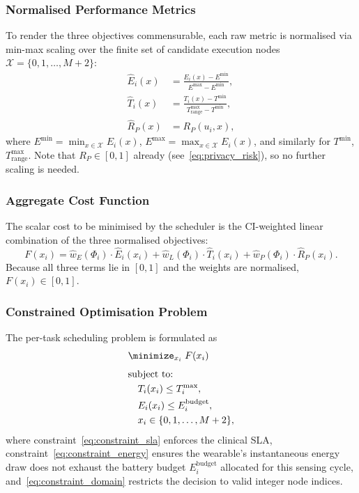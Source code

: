 \documentclass[journal,twoside,letterpaper]{IEEEtran}
\newcommand{\set}[1]{\mathcal{#1}}
\begin{document}
\subsubsection{Normalised Performance Metrics}

To render the three objectives commensurable, each raw metric is normalised
via min-max scaling over the finite set of candidate execution nodes
$\set{X} = \{0, 1, \ldots, M+2\}$:
\begin{align}
  \hat{E}_i(x) &= \frac{E_i(x) - E^{\min}}{E^{\max} - E^{\min}},
  \label{eq:norm_energy}\\[4pt]
  \hat{T}_i(x) &= \frac{T_i(x) - T^{\min}}{T^{\max}_{\mathrm{range}} - T^{\min}},
  \label{eq:norm_latency}\\[4pt]
  \hat{R}_P(x) &= R_P(u_i, x),
  \label{eq:norm_privacy}
\end{align}
where $E^{\min} = \min_{x \in \set{X}} E_i(x)$,
$E^{\max} = \max_{x \in \set{X}} E_i(x)$, and similarly for
$T^{\min}$, $T^{\max}_{\mathrm{range}}$.  Note that $R_P \in [0,1]$
already (see~\eqref{eq:privacy_risk}), so no further scaling is needed.

\subsubsection{Aggregate Cost Function}

The scalar cost to be minimised by the scheduler is the CI-weighted linear
combination of the three normalised objectives:
\begin{equation}
  F(x_i) =
    \hat{w}_E(\Phi_i) \cdot \hat{E}_i(x_i)
    + \hat{w}_L(\Phi_i) \cdot \hat{T}_i(x_i)
    + \hat{w}_P(\Phi_i) \cdot \hat{R}_P(x_i).
  \label{eq:cost_function}
\end{equation}
Because all three terms lie in $[0,1]$ and the weights are normalised,
$F(x_i) \in [0,1]$.

\subsubsection{Constrained Optimisation Problem}

The per-task scheduling problem is formulated as
\begin{align}
  &\minimize_{x_i}\; F(x_i) \label{eq:opt_obj}\\[4pt]
  &\text{subject to:}\nonumber\\
  &\quad T_i(x_i) \leq T^{\max}_i,     \label{eq:constraint_sla}\\
  &\quad E_i(x_i) \leq E^{\mathrm{budget}}_i, \label{eq:constraint_energy}\\
  &\quad x_i \in \{0, 1, \ldots, M+2\}, \label{eq:constraint_domain}
\end{align}
where constraint~\eqref{eq:constraint_sla} enforces the clinical SLA,
constraint~\eqref{eq:constraint_energy} ensures the wearable's instantaneous
energy draw does not exhaust the battery budget $E^{\mathrm{budget}}_i$
allocated for this sensing cycle, and~\eqref{eq:constraint_domain} restricts
the decision to valid integer node indices.
\end{document}
